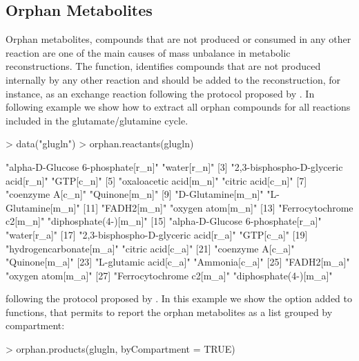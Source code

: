 \subsection{Orphan Metabolites}
Orphan metabolites, compounds that are not produced or consumed in any other reaction are one of the main causes of mass unbalance in metabolic reconstructions. The  function, identifies compounds that are not produced internally by any other reaction and should be added to the reconstruction, for instance, as an exchange reaction following the protocol proposed by \cite{Thiele2010}.  In following example we show how to extract all orphan compounds for all reactions included in the glutamate/glutamine cycle.
\begin{Schunk}
\begin{Sinput}
> data("glugln")
> orphan.reactants(glugln)
\end{Sinput}
\begin{Soutput}
 [1] "alpha-D-Glucose 6-phosphate[r_n]"    "water[r_n]"                         
 [3] "2,3-bisphospho-D-glyceric acid[r_n]" "GTP[c_n]"                           
 [5] "oxaloacetic acid[m_n]"               "citric acid[c_n]"                   
 [7] "coenzyme A[c_n]"                     "Quinone[m_n]"                       
 [9] "D-Glutamine[m_n]"                    "L-Glutamine[m_n]"                   
[11] "FADH2[m_n]"                          "oxygen atom[m_n]"                   
[13] "Ferrocytochrome c2[m_n]"             "diphosphate(4-)[m_n]"               
[15] "alpha-D-Glucose 6-phosphate[r_a]"    "water[r_a]"                         
[17] "2,3-bisphospho-D-glyceric acid[r_a]" "GTP[c_a]"                           
[19] "hydrogencarbonate[m_a]"              "citric acid[c_a]"                   
[21] "coenzyme A[c_a]"                     "Quinone[m_a]"                       
[23] "L-glutamic acid[c_a]"                "Ammonia[c_a]"                       
[25] "FADH2[m_a]"                          "oxygen atom[m_a]"                   
[27] "Ferrocytochrome c2[m_a]"             "diphosphate(4-)[m_a]"               
\end{Soutput}
 following the protocol proposed by \cite{Thiele2010}. In this example we show the option added to  functions, that permits to report the orphan metabolites as a list grouped by compartment:
\begin{Sinput}
> orphan.products(glugln, byCompartment = TRUE)
\end{Sinput}
\end{Schunk}
